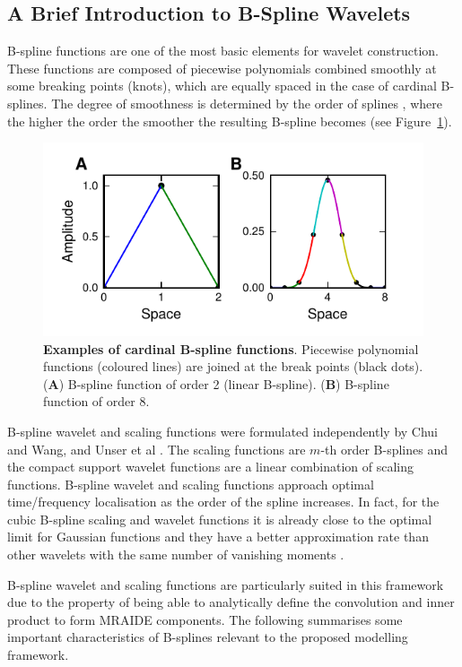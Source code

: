 \documentclass[11pt,draftcls,onecolumn,peerreview]{IEEEtran}
\begin{document}
\subsection{A Brief Introduction to B-Spline Wavelets}
B-spline functions are one of the most basic elements for wavelet construction. These functions are composed of piecewise polynomials combined smoothly at some breaking points (knots), which are equally spaced in the case of cardinal B-splines. The degree of smoothness is determined by the order of splines \cite{Goswami1999}, where the higher the order the smoother the resulting B-spline becomes (see Figure~\ref{fig:Figure0}).
\begin{figure}[!t]
\centering
\includegraphics{./Graph/Figure0.pdf}
\caption{{\bf Examples of cardinal B-spline functions}. Piecewise polynomial functions (coloured lines) are joined at the break points (black dots). (\textbf{A}) B-spline function of order 2 (linear B-spline). (\textbf{B}) B-spline function of order 8.}
\label{fig:Figure0}
\end{figure}
 
B-spline wavelet and scaling functions were formulated independently by Chui and Wang, and Unser et al \cite{Chui1992b,Chui1992,Unser1993}.  The scaling functions are $m$-th order B-splines and the compact support wavelet functions are a linear combination of scaling functions. B-spline wavelet and scaling functions approach optimal time/frequency localisation as the order of the spline increases. In fact, for the cubic B-spline scaling and wavelet functions it is already close to the optimal limit for Gaussian functions and they have a better approximation rate than other wavelets with the same number of vanishing moments \cite{Unser1999}. 

B-spline wavelet and scaling functions are particularly suited in this framework due to the property of being able to analytically define the convolution and inner product to form MRAIDE components. The following summarises some important characteristics of B-splines relevant to the proposed modelling framework. 
\end{document}
